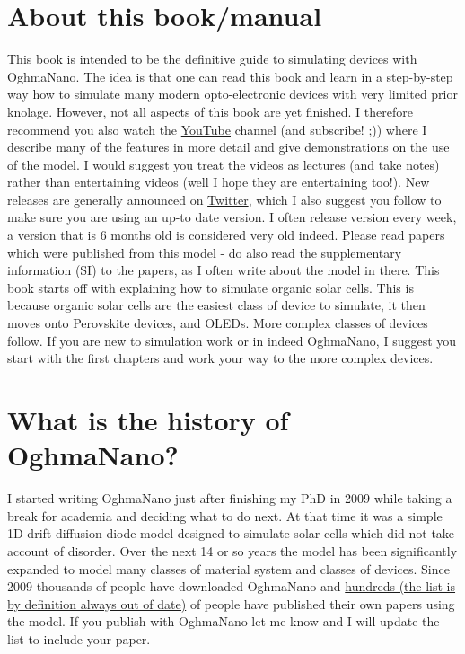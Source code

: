 \section{About this book/manual}
This book is intended to be the definitive guide to simulating devices with OghmaNano. The idea is that one can read this book and learn in a step-by-step way how to simulate many modern opto-electronic devices with very limited prior knolage.  However, not all aspects of this book are yet finished. I therefore recommend you also watch the \href{https://www.youtube.com/channel/UCbm_0AKX1SpbMMT7jilxFfA}{YouTube} channel (and subscribe! ;)) where I describe many of the features in more detail and give demonstrations on the use of the model. I would suggest you treat the videos as lectures (and take notes) rather than entertaining videos (well I hope they are entertaining too!). New releases are generally announced on \href{https://twitter.com/OghmaNano}{Twitter}, which I also suggest you follow to make sure you are using an up-to date version. I often release version every week, a version that is 6 months old is considered very old indeed.  Please read papers which were published from this model - do also read the supplementary information (SI) to the papers, as I often write about the model in there.
This book starts off with explaining how to simulate organic solar cells. This is because organic solar cells are the easiest class of device to simulate, it then moves onto Perovskite devices, and OLEDs. More complex classes of devices follow.  If you are new to simulation work or in indeed OghmaNano, I suggest you start with the first chapters and work your way to the more complex devices.

\section{What is the history of OghmaNano?}
I started writing OghmaNano just after finishing my PhD in 2009 while taking a break for academia and deciding what to do next. At that time it was a simple 1D drift-diffusion diode model designed to simulate solar cells which did not take account of disorder.  Over the next 14 or so years the model has been significantly expanded to model many classes of material system and classes of devices. Since 2009 thousands of people have downloaded OghmaNano and \href{http://www.Oghma-Nano.com/publications.html}{hundreds (the list is by definition always out of date)} of people have published their own papers using the model. If you publish with OghmaNano let me know and I will update the list to include your paper.

